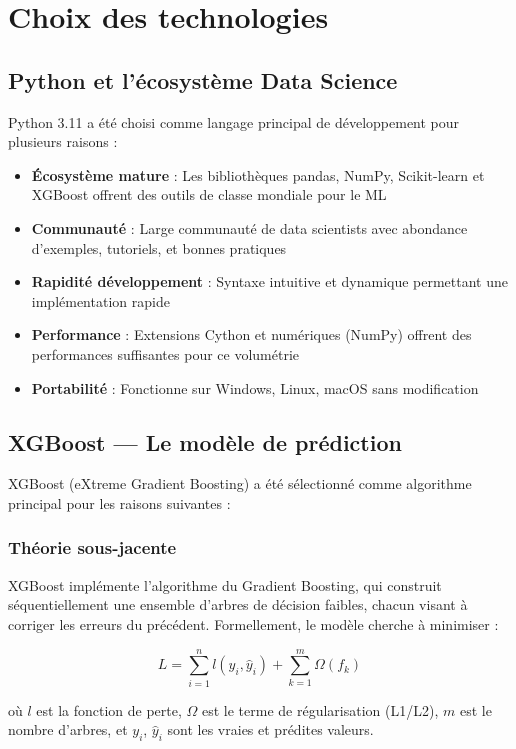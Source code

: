 \documentclass[a4paper,12pt,twoside]{report}
\begin{document}
\section{Choix des technologies}

\subsection{Python et l'écosystème Data Science}

Python 3.11 a été choisi comme langage principal de développement pour plusieurs raisons :

\begin{itemize}
    \item \textbf{Écosystème mature} : Les bibliothèques pandas, NumPy, Scikit-learn et XGBoost offrent des outils de classe mondiale pour le ML
    \item \textbf{Communauté} : Large communauté de data scientists avec abondance d'exemples, tutoriels, et bonnes pratiques
    \item \textbf{Rapidité développement} : Syntaxe intuitive et dynamique permettant une implémentation rapide
    \item \textbf{Performance} : Extensions Cython et numériques (NumPy) offrent des performances suffisantes pour ce volumétrie
    \item \textbf{Portabilité} : Fonctionne sur Windows, Linux, macOS sans modification
\end{itemize}

\subsection{XGBoost — Le modèle de prédiction}

XGBoost (eXtreme Gradient Boosting) a été sélectionné comme algorithme principal pour les raisons suivantes :

\subsubsection{Théorie sous-jacente}

XGBoost implémente l'algorithme du Gradient Boosting, qui construit séquentiellement une ensemble d'arbres de décision faibles, chacun visant à corriger les erreurs du précédent. Formellement, le modèle cherche à minimiser :

$$L = \sum_{i=1}^{n} l(y_i, \hat{y}_i) + \sum_{k=1}^{m} \Omega(f_k)$$

où $l$ est la fonction de perte, $\Omega$ est le terme de régularisation (L1/L2), $m$ est le nombre d'arbres, et $y_i$, $\hat{y}_i$ sont les vraies et prédites valeurs.
\end{document}
